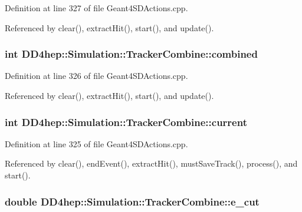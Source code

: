 Definition at line 327 of file Geant4SDActions.cpp.

Referenced by clear(), extractHit(), start(), and update().\hypertarget{struct_d_d4hep_1_1_simulation_1_1_tracker_combine_a09c500ccd4bca917b081930ae9e2c5ce}{
\subsubsection[{combined}]{\setlength{\rightskip}{0pt plus 5cm}int {\bf DD4hep::Simulation::TrackerCombine::combined}}}
\label{struct_d_d4hep_1_1_simulation_1_1_tracker_combine_a09c500ccd4bca917b081930ae9e2c5ce}


Definition at line 326 of file Geant4SDActions.cpp.

Referenced by clear(), extractHit(), start(), and update().\hypertarget{struct_d_d4hep_1_1_simulation_1_1_tracker_combine_aa8bb9faf2d8ce6bac98f969e5bb9943c}{
\subsubsection[{current}]{\setlength{\rightskip}{0pt plus 5cm}int {\bf DD4hep::Simulation::TrackerCombine::current}}}
\label{struct_d_d4hep_1_1_simulation_1_1_tracker_combine_aa8bb9faf2d8ce6bac98f969e5bb9943c}


Definition at line 325 of file Geant4SDActions.cpp.

Referenced by clear(), endEvent(), extractHit(), mustSaveTrack(), process(), and start().\hypertarget{struct_d_d4hep_1_1_simulation_1_1_tracker_combine_acd9b60d0c1b8cee45c1745a4ae167d24}{
\subsubsection[{e\_\-cut}]{\setlength{\rightskip}{0pt plus 5cm}double {\bf DD4hep::Simulation::TrackerCombine::e\_\-cut}}}
\label{struct_d_d4hep_1_1_simulation_1_1_tracker_combine_acd9b60d0c1b8cee45c1745a4ae167d24}


